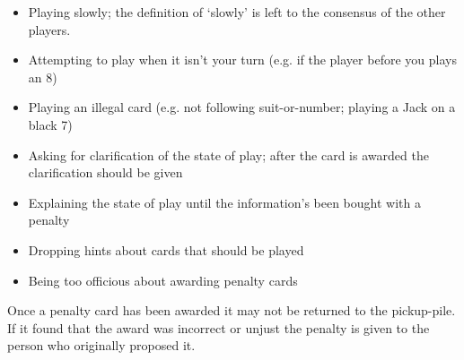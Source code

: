 \documentclass[12pt]{article}
\begin{document}
\begin{itemize}
  \item Playing slowly;  the definition of `slowly' is left to the consensus of the other players.

  \item Attempting to play when it isn't your turn (e.g. if the player before you plays an 8)

  \item Playing an illegal card (e.g. not following suit-or-number;  playing a Jack on a black 7)

  \item Asking for clarification of the state of play;  after the card is awarded the
    clarification should be given

  \item Explaining the state of play until the information's been bought with a penalty

  \item Dropping hints about cards that should be played

  \item Being too officious about awarding penalty cards
\end{itemize}

Once a penalty card has been awarded it may not be returned to the pickup-pile.  If it found that the award was
incorrect or unjust the penalty is given to the person who originally proposed it.
\end{document}
